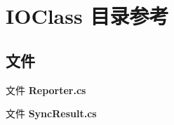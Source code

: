\section{I\+O\+Class 目录参考}
\label{dir_3e26b01065ce601b228ac51400daff26}
\subsection*{文件}
\begin{DoxyCompactItemize}
\item 
文件 \textbf{ Reporter.\+cs}
\item 
文件 \textbf{ Sync\+Result.\+cs}
\end{DoxyCompactItemize}
